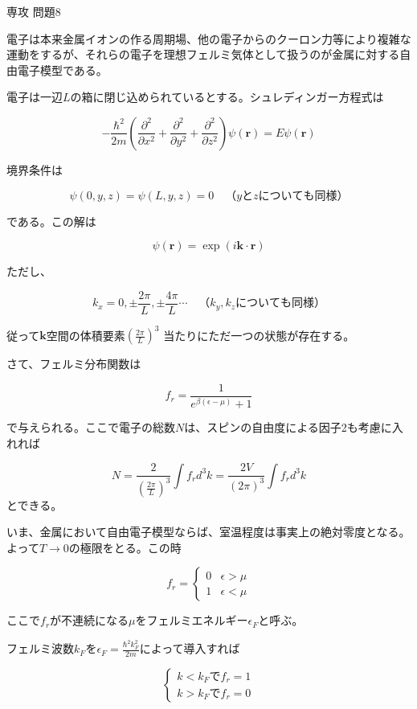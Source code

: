 \documentclass[fleqn]{jbook}
\begin{document}
\begin{answer}{専攻 問題8}{}

\begin{subanswers}

\SubAnswer

電子は本来金属イオンの作る周期場、他の電子からのクーロン力等により複雑な運動をするが、それらの電子を理想フェルミ気体として扱うのが金属に対する自由電子模型である。

電子は一辺$L$の箱に閉じ込められているとする。シュレディンガー方程式は

\[
- \frac{\hbar^{2}}{2 m}\left(\frac{\partial^2}{\partial x^2} + \frac{\partial^2}{\partial y^2} + \frac{\partial^2}{\partial z^2}\right) \psi(\mathbf{r}) = E \psi(\mathbf{r})
\]

境界条件は

\[
\psi(0,y,z) = \psi(L,y,z) = 0 \quad （yとzについても同様）
\]

である。この解は

\[
\psi(\mathbf{r}) = \exp(i \mathbf{k} \cdot \mathbf{r})
\]

ただし、

\[
k_{x} = 0 , \pm \frac{2 \pi}{L} , \pm \frac{4 \pi}{L} \cdots \quad （k_{y},k_{z}についても同様）
\]

従って$\mathbf{k}$空間の体積要素$ (\frac{2 \pi}{L})^3 $ 当たりにただ一つの状態が存在する。

さて、フェルミ分布関数は

\[
f_{r} = \frac{1}{e^{\beta(\epsilon - \mu)} + 1}
\]

で与えられる。ここで電子の総数$N$は、スピンの自由度による因子2も考慮に入れれば

\[
N = \frac{2}{(\frac{2 \pi}{L})^3} \int f_{r} d^3 k = \frac{2 V}{(2 \pi)^3} \int f_{r} d^3 k
\]
とできる。

いま、金属において自由電子模型ならば、室温程度は事実上の絶対零度となる。よって$T \rightarrow 0 $の極限をとる。この時

\[
f_{r} = 
\left\{
\begin{array}{cc}
0 & \epsilon > \mu \\
1 & \epsilon < \mu 
\end{array}
\right.
\]

ここで$f_{r}$が不連続になる$\mu$をフェルミエネルギー$ \epsilon_{F} $と呼ぶ。

フェルミ波数$k_{F}$を$\epsilon_{F} = \frac{\hbar^2 k_{F}^2}{2 m}$によって導入すれば

\[
\left\{
\begin{array}{c}
k<k_{F} で f_{r}=1 \\
k>k_{F} で f_{r}=0
\end{array}
\right.
\]


\end{subanswers}
\end{answer}
\end{document}
